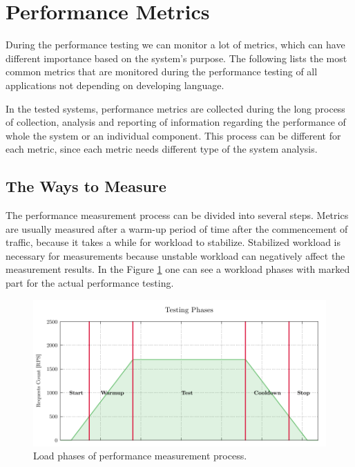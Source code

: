 \section{Performance Metrics}
\label{Performance Metrics}

During the performance testing we can monitor a lot of metrics, which can have different importance based on the system's purpose. The following lists the most common metrics that are monitored during the performance testing of all applications not depending on developing language.

In the tested systems, performance metrics are collected during the long process of collection, analysis and reporting of information regarding the performance of whole the system or an individual component. This process can be different for each metric, since each metric needs different type of the system analysis.

\subsection*{The Ways to Measure}
The performance measurement process can be divided into several steps. Metrics are usually measured after a warm-up period of time after the commencement of traffic, because it takes a while for workload to stabilize. Stabilized workload is necessary for measurements because unstable workload can negatively affect the measurement results. In the Figure \ref{fig:measurements} one can see a workload phases with marked part for the actual performance testing.

\begin{figure}[H]
  \centering
  \includegraphics[width=15cm]{obrazky-figures/measure_demo.pdf}
  \caption{Load phases of performance measurement process.}
  \label{fig:measurements}
\end{figure}

